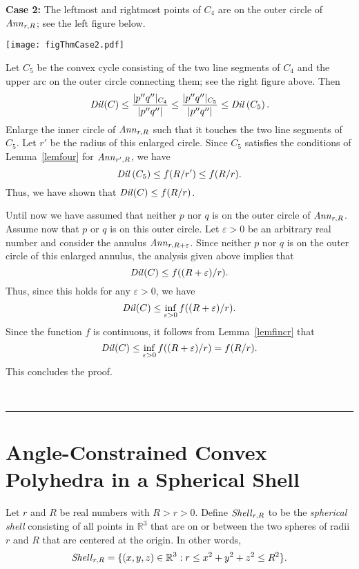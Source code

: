 \documentclass[12pt]{article}
\newcommand{\IR}{\mathbb{R}}
\newcommand{\Ann}{\mathord{\it Ann}}
\newcommand{\Shell}{\mathord{\it Shell}}
\newcommand{\Dil}{\mathord{\it Dil}}
\newcommand{\qed}{\rule{0.5em}{1.5ex}}
\newcommand{\fqed}{{\hfill~\qed}}
\newenvironment{proof}{{\noindent \bf Proof.}}
                      {{\hfill \fqed} \vspace{1em}}
\begin{document}
\begin{proof}
\vspace{0.5em} 

\noindent 
{\bf Case 2:} The leftmost and rightmost points of $C_4$ are on the 
outer circle of $\Ann_{r,R}$; see the left figure below. 

\begin{center}
   \texttt{[image: figThmCase2.pdf]}
\end{center}

Let $C_5$ be the convex cycle consisting of the two line segments 
of $C_4$ and the upper arc on the outer circle connecting them; see 
the right figure above. Then 
\[ \Dil(C) \leq \frac{|p''q''|_{C_4}}{|p''q''|} \leq  
     \frac{|p''q''|_{C_5}}{|p''q''|} \leq \Dil \left( C_5 \right) . 
\] 
Enlarge the inner circle of $\Ann_{r,R}$ such that it touches the 
two line segments of $C_5$. Let $r'$ be the radius of this enlarged 
circle. Since $C_5$ satisfies the conditions of Lemma~\ref{lemfour}
for $\Ann_{r',R}$, we have  
\[ \Dil \left( C_5 \right) \leq f(R/r') \leq f(R/r) . 
\] 
Thus, we have shown that $\Dil(C) \leq f(R/r)$. 

\vspace{0.5em} 

Until now we have assumed that neither $p$ nor $q$ is on the outer 
circle of $\Ann_{r,R}$. Assume now that $p$ or $q$ is on this outer 
circle. Let $\varepsilon>0$ be an arbitrary real number and consider 
the annulus $\Ann_{r,R+\varepsilon}$. Since neither $p$ nor $q$ is on 
the outer circle of this enlarged annulus, the analysis given above 
implies that 
\[ \Dil(C) \leq f((R+\varepsilon)/r) . 
\] 
Thus, since this holds for any $\varepsilon>0$, we have 
\[ \Dil(C) \leq \inf_{\varepsilon>0} f((R+\varepsilon)/r) . 
\] 
Since the function $f$ is continuous, it follows from 
Lemma~\ref{lemfincr} that 
\[ \Dil(C) \leq \inf_{\varepsilon>0} f((R+\varepsilon)/r) = f(R/r) . 
\] 
This concludes the proof. 
\end{proof} 


\section{Angle-Constrained Convex Polyhedra in a Spherical Shell} 
\label{secACSH} 

Let $r$ and $R$ be real numbers with $R>r>0$. Define $\Shell_{r,R}$ 
to be the \emph{spherical shell} consisting of all points in $\IR^3$ 
that are on or between the two spheres of radii $r$ and $R$ that are 
centered at the origin. In other words, 
\[ \Shell_{r,R} = \{ (x,y,z) \in \IR^3 : 
            r \leq x^2 + y^2 + z^2 \leq R^2 \} . 
\] 
\end{document}
